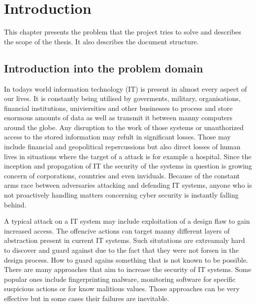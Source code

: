\documentclass[a4paper,twoside,12pt]{book}
\newcounter{PagesWithoutNumbers}
\begin{document}
\vfill
 
 

\cleardoublepage


\pagestyle{onlyPageNumbers}
\tableofcontents

\setcounter{PagesWithoutNumbers}{\value{page}}
\mainmatter
\pagestyle{PageNumbersChapterTitles}


\chapter{Introduction}

This chapter presents the problem that the project tries to solve and describes the scope 
of the thesis. It also describes the document structure.



\section{Introduction into the problem domain}


In todays world information technology (IT) is present in almost every aspect of our lives. 
It is constantly being utilised by goverments, military, organisations, financial institutions,
univiersities and other businesses to process and store enormous amounts of data as well as 
transmit it between manny computers around the globe. Any disruption to the work of those 
systems or unauthorized access to the stored information may refult in significant losses.
Those may include financial and geopolitical repercussions but also direct losses of human
lives in situations where the target of a attack is for example a hospital. Since the inception
and propagation of IT the security of the systems in question is growing concern of corporations, 
countries and even inviduals. Because of the constant arms race between adversaries attacking 
and defending IT systems, anyone who is not proactively handling matters concerning cyber security 
is instantly falling behind. \cite{bib:articleImportanceOfCybersecurity} 

A typical attack on a IT system may include exploitation of a design 
flaw to gain increased access. The offencive actions can target manny different layers of 
abstraction present in current IT systems. Such situtations are extreamaly hard to discover 
and guard against due to the fact that they were not forsen in the design process. How to guard 
agains something that is not known to be possible. There are many approaches that aim to 
increase the security of IT systems. Some popular ones include fingerprinting malware, 
monitoring software for specific suspicious actions or for know 
malitious values. Those approaches can be very effective but in some cases their 
failures are inevitable.
\end{document}
